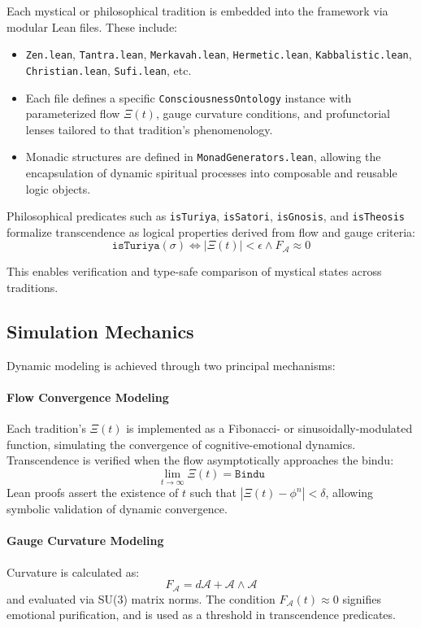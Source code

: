 \documentclass[12pt]{article}
\theoremstyle{plain}
\begin{document}
Each mystical or philosophical tradition is embedded into the framework via modular Lean files. These include:

\begin{itemize}
    \item \texttt{Zen.lean}, \texttt{Tantra.lean}, \texttt{Merkavah.lean}, \texttt{Hermetic.lean}, \texttt{Kabbalistic.lean}, \texttt{Christian.lean}, \texttt{Sufi.lean}, etc.
    \item Each file defines a specific \texttt{ConsciousnessOntology} instance with parameterized flow $\Xi(t)$, gauge curvature conditions, and profunctorial lenses tailored to that tradition's phenomenology.
    \item Monadic structures are defined in \texttt{MonadGenerators.lean}, allowing the encapsulation of dynamic spiritual processes into composable and reusable logic objects.
\end{itemize}

Philosophical predicates such as \texttt{isTuriya}, \texttt{isSatori}, \texttt{isGnosis}, and \texttt{isTheosis} formalize transcendence as logical properties derived from flow and gauge criteria:
\[
\texttt{isTuriya}(\sigma) \iff |\Xi(t)| < \epsilon \land F_{\mathcal{A}} \approx 0
\]

This enables verification and type-safe comparison of mystical states across traditions.

\subsection{Simulation Mechanics}

Dynamic modeling is achieved through two principal mechanisms:

\paragraph{Flow Convergence Modeling}
Each tradition's $\Xi(t)$ is implemented as a Fibonacci- or sinusoidally-modulated function, simulating the convergence of cognitive-emotional dynamics. Transcendence is verified when the flow asymptotically approaches the bindu:
\[
\lim_{t \to \infty} \Xi(t) = \texttt{Bindu}
\]
Lean proofs assert the existence of $t$ such that $|\Xi(t) - \phi^n| < \delta$, allowing symbolic validation of dynamic convergence.

\paragraph{Gauge Curvature Modeling}
Curvature is calculated as:
\[
F_{\mathcal{A}} = d\mathcal{A} + \mathcal{A} \wedge \mathcal{A}
\]
and evaluated via SU(3) matrix norms. The condition $F_{\mathcal{A}}(t) \approx 0$ signifies emotional purification, and is used as a threshold in transcendence predicates.
\end{document}
